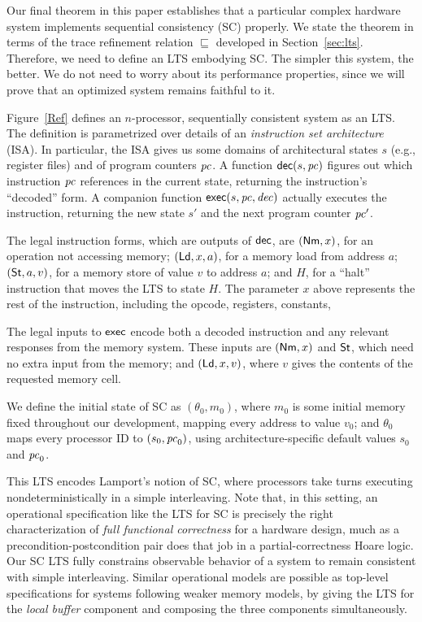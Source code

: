 Our final theorem in this paper establishes that a particular complex hardware
system implements sequential consistency (SC) properly.  We state the theorem
in terms of the trace refinement relation $\sqsubseteq$ developed in
Section~\ref{sec:lts}.
Therefore, we need to define an LTS embodying SC.  The simpler this
system, the better.  We do not need to worry about its performance properties,
since we will prove that an optimized system remains faithful to it.

Figure~\ref{Ref} defines an $n$-processor, sequentially consistent system as an
LTS.  The definition is parametrized over details of an \emph{instruction set
architecture} (ISA).  In particular, the ISA gives us some domains of
architectural states $s$ (e.g., register files) and of program counters $\mathit{pc}$.
A function $\mathsf{dec}(s, \mathit{pc})$ figures out which instruction $\mathit{pc}$ references in the
current state, returning the instruction's ``decoded'' form.  A companion
function $\mathsf{exec}(s, \mathit{pc}, \mathit{dec})$ actually executes the instruction,
returning the new state $s'$ and the next program counter $\mathit{pc}'$.

The legal instruction forms, which are outputs of $\mathsf{dec}$, are $(\mathsf{Nm}, x)$, for
an operation not accessing memory; $(\mathsf{Ld}, x, a)$, for a memory load from
address $a$; $(\mathsf{St}, a, v)$, for a memory store of value $v$ to address $a$; and
$H$, for a ``halt'' instruction that moves the LTS to state $H$. The parameter
$x$ above represents the rest of the instruction, including the
opcode, registers, constants, \etc{}

The legal inputs to $\mathsf{exec}$ encode both a decoded instruction and any relevant
responses from the memory system.  These inputs are $(\mathsf{Nm}, x)$ and $\mathsf{St}$, which
need no extra input from the memory; and $(\mathsf{Ld}, x, v)$, where $v$ gives the
contents of the requested memory cell.

We define the initial state of SC as $(\theta_0, m_0)$, where $m_0$ is
some initial memory fixed throughout our development, mapping every
address to value $v_0$; and $\theta_0$ maps every processor ID to
$(s_0, \mathit{pc}_0)$, using architecture-specific default values $s_0$ and
$\mathit{pc}_0$.

\medskip

This LTS encodes Lamport's notion of SC, where processors take turns executing
nondeterministically in a simple interleaving.
Note that, in this setting, an operational specification like the LTS
for SC is precisely the right characterization of \emph{full functional
  correctness} for a hardware design, much as a
precondition-postcondition pair does that job in a partial-correctness
Hoare logic.  Our SC LTS fully constrains observable behavior of a
system to remain consistent with simple interleaving.  Similar
operational models are possible as top-level specifications for
systems following weaker memory models, by giving the LTS for the \emph{local
buffer} component and composing the three components simultaneously.

